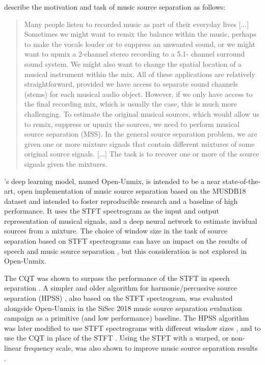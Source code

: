 \documentclass[report.tex]{subfiles}
\begin{document}
\textcite{musicsepgood} describe the motivation and task of music source separation as follows:

\begin{quote}
	Many people listen to recorded music as part of their everyday lives [...] Sometimes we might want to remix the balance within the music, perhaps to make the vocals louder or to suppress an unwanted sound, or we might want to upmix a 2-channel stereo recording to a 5.1- channel surround sound system. We might also want to change the spatial location of a musical instrument within the mix. All of these applications are relatively straightforward, provided we have access to separate sound channels (stems) for each musical audio object. However, if we only have access to the final recording mix, which is usually the case, this is much more challenging. To estimate the original musical sources, which would allow us to remix, suppress or upmix the sources, we need to perform musical source separation (MSS). In the general source separation problem, we are given one or more mixture signals that contain different mixtures of some original source signals. [...] The task is to recover one or more of the source signals given the mixtures.
\end{quote}

\textcite{umx}'s deep learning model, named Open-Unmix, is intended to be a near state-of-the-art, open implementation of music source separation based on the MUSDB18 dataset \cite{musdb18} and intended to foster reproducible research and a baseline of high performance. It uses the STFT spectrogram as the input and output representation of musical signals, and a deep neural network to estimate invidual sources from a mixture. The choice of window size in the task of source separation based on STFT spectrograms can have an impact on the results of speech and music source separation \cite{musicsepwindow}, but this consideration is not explored in Open-Unmix.

The CQT was shown to surpass the performance of the STFT in speech separation \cite{cqtseparation}. A simpler and older algorithm for harmonic/percussive source separation (HPSS) \cite{fitzgerald1}, also based on the STFT spectrogram, was evaluated alongside Open-Unmix in the SiSec 2018 music source separation evaluation campaign \cite{sisec2018} as a primitive (and low performance) baseline. The HPSS algorithm was later modified to use STFT spectrograms with different window sizes \cite{driedger, fitzgerald2}, and to use the CQT in place of the STFT \cite{fitzgerald2}. Using the STFT with a warped, or non-linear frequency scale, was also shown to improve music source separation results \cite{bettermusicsep}.
\end{document}
